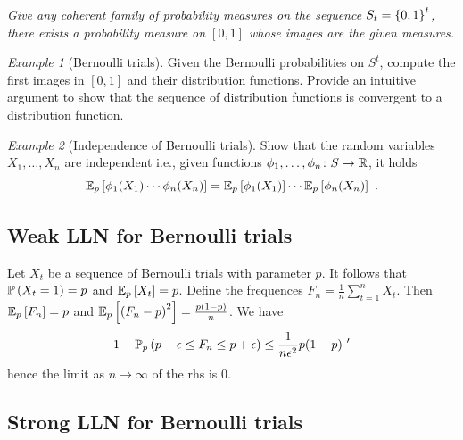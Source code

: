 \documentclass[12pt,a4paper]{amsart}
\theoremstyle{plain}%
\theoremstyle{definition}
\theoremstyle{remark}
\newtheorem{example}{Example}
\begin{document}
\bigskip

\emph{Give any coherent family of probability measures on the sequence $S_t = \left\{0,1\right\}^t$, there exists a probability measure on $[0,1]$ whose images are the given measures.}

\begin{example}[Bernoulli trials]
Given the Bernoulli probabilities on $S^t$, compute the first images in $[0,1]$ and their distribution functions. Provide an intuitive argument to show that the sequence of distribution functions is convergent to a distribution function.  
\end{example}

\bigskip

\begin{example}[Independence of Bernoulli trials]
Show that the random variables $X_1,\dots,X_n$ are independent i.e., given functions $\phi_1,\dots,\phi_n \colon S \to \mathbb{R}$, it holds
\begin{equation*}
  \operatorname{\mathbb E}_{p}\left[\phi_1(X_1) \cdots \phi_n(X_n)\right] = \operatorname{\mathbb E}_{p}\left[\phi_1(X_1)\right] \cdots \operatorname{\mathbb E}_{p}\left[\phi_n(X_n)\right] \ .
\end{equation*}
\end{example}

\bigskip
\subsection{Weak LLN for Bernoulli trials}

Let $X_t$ be a sequence of Bernoulli trials with parameter $p$. It follows that $\operatorname{\mathbb P}\left(X_t=1\right) = p$ and $\operatorname{\mathbb E}_{p}\left[X_t\right] = p$. Define the frequences $F_n = \frac1n \sum_{t=1}^n X_t$. Then $\operatorname{\mathbb E}_{p}\left[F_n\right] = p$ and $\operatorname{\mathbb E}_{p}\left[\left(F_n - p\right)^2\right] = \frac {p(1-p)}n$. We have
\begin{equation*}
  1 - \probat p {p - \epsilon \leq F_n \leq p + \epsilon} \leq \frac1{n\epsilon^2} p(1-p) \ '
\end{equation*}
hence the limit as $n \to \infty$ of the rhs is 0.

\subsection{Strong LLN for Bernoulli trials}
\end{document}
